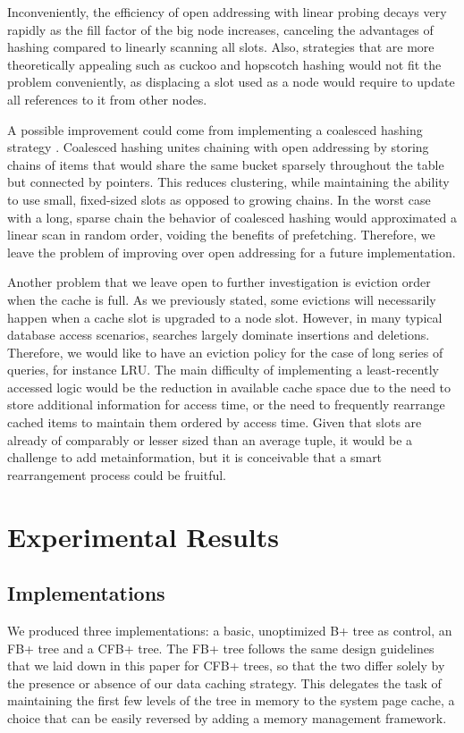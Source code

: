 \documentclass{article}
\begin{document}
Inconveniently, the efficiency of open addressing with linear probing decays very rapidly as the fill factor
of the big node increases, canceling the advantages of hashing compared to linearly scanning all slots.
Also, strategies that are more theoretically appealing such as cuckoo and hopscotch hashing
would not fit the problem conveniently, as displacing a slot used as a node would require to update all references
to it from other nodes.

A possible improvement could come from implementing a coalesced hashing strategy \citep{Vitter:1987}.
Coalesced hashing unites chaining with open addressing by storing chains of items that would
share the same bucket sparsely throughout the table but connected by pointers.
This reduces clustering, while maintaining the ability to use small, fixed-sized slots as opposed to growing chains.
In the worst case with a long, sparse chain the behavior of coalesced hashing would approximated a linear
scan in random order, voiding the benefits of prefetching.
Therefore, we leave the problem of improving over open addressing for a future implementation.

Another problem that we leave open to further investigation is eviction order when the cache is full.
As we previously stated, some evictions will necessarily happen when a cache slot is upgraded to a node slot.
However, in many typical database access scenarios, searches largely dominate insertions and deletions.
Therefore, we would like to have an eviction policy for the case of long series of queries, for instance LRU.
The main difficulty of implementing a least-recently accessed logic would be the reduction
in available cache space due to the need to store additional information for access time,
or the need to frequently rearrange cached items to maintain them ordered by access time.
Given that slots are already of comparably or lesser sized than an average tuple, it would be a challenge
to add metainformation, but it is conceivable that a smart rearrangement process could be fruitful.

\section{Experimental Results}

\subsection{Implementations}
We produced three implementations: a basic, unoptimized B+ tree as control, an FB+ tree and a CFB+ tree.
The FB+ tree follows the same design guidelines that we laid down in this paper for CFB+ trees,
so that the two differ solely by the presence or absence of our data caching strategy.
This delegates the task of maintaining the first few levels of the tree in memory to the system page cache,
a choice that can be easily reversed by adding a memory management framework.
\end{document}
